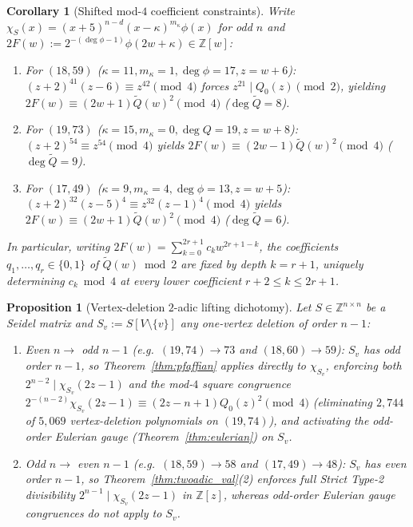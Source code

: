 \documentclass[11pt,reqno]{amsart}
\newtheorem{proposition}[theorem]{Proposition}
\newtheorem{corollary}[theorem]{Corollary}
\theoremstyle{definition}
\theoremstyle{remark}
\numberwithin{equation}{section}
\numberwithin{table}{section}
\begin{document}
\begin{corollary}[Shifted mod-$4$ coefficient constraints]\label{cor:cor43_full}
Write $\chi_S(x) = (x + 5)^{n - d}(x - \kappa)^{m_\kappa} \phi(x)$ for odd $n$ and $2F(w) := 2^{-(\deg\phi - 1)} \phi(2w + \kappa) \in \mathbb{Z}[w]$:
\begin{enumerate}
  \item For $(18, 59)$ ($\kappa = 11, m_\kappa = 1, \deg\phi = 17, z = w + 6$): $(z + 2)^{41}(z - 6) \equiv z^{42} \pmod 4$ forces $z^{21} \mid Q_0(z) \pmod 2$, yielding $2F(w) \equiv (2w + 1)\tilde{Q}(w)^2 \pmod 4$ ($\deg\tilde{Q} = 8$).
  \item For $(19, 73)$ ($\kappa = 15, m_\kappa = 0, \deg Q = 19, z = w + 8$): $(z + 2)^{54} \equiv z^{54} \pmod 4$ yields $2F(w) \equiv (2w - 1)\tilde{Q}(w)^2 \pmod 4$ ($\deg\tilde{Q} = 9$).
  \item For $(17, 49)$ ($\kappa = 9, m_\kappa = 4, \deg\phi = 13, z = w + 5$): $(z + 2)^{32}(z - 5)^4 \equiv z^{32}(z - 1)^4 \pmod 4$ yields $2F(w) \equiv (2w + 1)\tilde{Q}(w)^2 \pmod 4$ ($\deg\tilde{Q} = 6$).
\end{enumerate}
In particular, writing $2F(w) = \sum_{k=0}^{2r+1} c_k w^{2r+1-k}$, the coefficients $q_1, \dots, q_r \in \{0, 1\}$ of $\tilde{Q}(w) \bmod 2$ are fixed by depth $k = r + 1$, uniquely determining $c_k \bmod 4$ at every lower coefficient $r + 2 \le k \le 2r + 1$.
\end{corollary}

\begin{proposition}[Vertex-deletion $2$-adic lifting dichotomy]\label{prop:vdel_dichotomy}
Let $S \in \mathbb{Z}^{n \times n}$ be a Seidel matrix and $S_v := S[V \setminus \{v\}]$ any one-vertex deletion of order $n - 1$:
\begin{enumerate}
  \item \emph{Even $n \to$ odd $n - 1$ (e.g.\ $(19, 74) \to 73$ and $(18, 60) \to 59$):} $S_v$ has odd order $n - 1$, so Theorem~\ref{thm:pfaffian} applies directly to $\chi_{S_v}$, enforcing both $2^{n-2} \mid \chi_{S_v}(2z - 1)$ and the mod-$4$ square congruence $2^{-(n-2)}\chi_{S_v}(2z - 1) \equiv (2z - n + 1)Q_0(z)^2 \pmod 4$ (eliminating $2{,}744$ of $5{,}069$ vertex-deletion polynomials on $(19, 74)$), and activating the odd-order Eulerian gauge (Theorem~\ref{thm:eulerian}) on $S_v$.
  \item \emph{Odd $n \to$ even $n - 1$ (e.g.\ $(18, 59) \to 58$ and $(17, 49) \to 48$):} $S_v$ has even order $n - 1$, so Theorem~\ref{thm:twoadic_val}(2) enforces full Strict Type-2 divisibility $2^{n-1} \mid \chi_{S_v}(2z - 1)$ in $\mathbb{Z}[z]$, whereas odd-order Eulerian gauge congruences do \emph{not} apply to $S_v$.
\end{enumerate}
\end{proposition}
\end{document}
